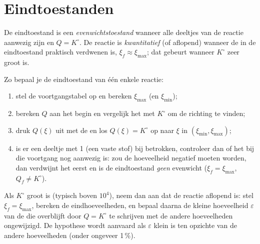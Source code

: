 \section{Eindtoestanden}

\begin{definition}\label{def:b1:extent-q-and-k:quantitative}
De eindtoestand is een \emph{evenwichtstoestand}
wanneer alle deeltjes van de reactie aanwezig zijn en $Q = K^\circ$. De
reactie is \emph{kwantitatief} (of aflopend)
wanneer de  in de eindtoestand praktisch verdwenen
is, $\xi_f \approx \xi_{\max}$; dat gebeurt wanneer $K^\circ$ zeer groot
is.
\end{definition}

\begin{method}\label{met:b1:extent-q-and-k:final-state}
Zo bepaal je de eindtoestand van één enkele reactie:
\begin{enumerate}
  \item stel de voortgangstabel op en bereken $\xi_{\max}$ (en
        $\xi_{\min}$);
  \item bereken $Q$ aan het begin en vergelijk het met $K^\circ$ om de
        richting te vinden;
  \item druk $Q(\xi)$ uit met de  en los $Q(\xi) = K^\circ$ op
        naar $\xi$ in $(\xi_{\min}, \xi_{\max})$;
  \item is er een deeltje met  1 (een vaste stof) bij betrokken,
        controleer dan of het bij die voortgang nog aanwezig is: zou de
        hoeveelheid negatief moeten worden, dan verdwijnt het eerst en is
        de eindtoestand \emph{geen} evenwicht ($\xi_f = \xi_{\max}$,
        $Q_f \ne K^\circ$).
\end{enumerate}
\end{method}

\begin{method}\label{met:b1:extent-q-and-k:quantitative}
Als $K^\circ$ groot is (typisch boven $10^4$), neem dan aan dat de
reactie aflopend is: stel $\xi_f = \xi_{\max}$, bereken de
eindhoeveelheden, en bepaal daarna de kleine hoeveelheid $\varepsilon$
van de  die overblijft door $Q =
K^\circ$ te schrijven met de andere hoeveelheden ongewijzigd. De
hypothese wordt aanvaard als $\varepsilon$ klein is ten opzichte van de
andere hoeveelheden (onder ongeveer 1\,\%).
\end{method}

